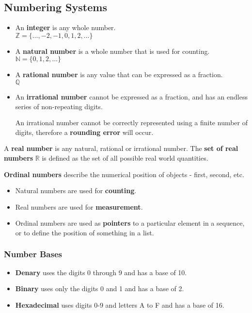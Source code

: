 \subsection{Numbering Systems}

\begin{itemize}
    \item An \textbf{integer} is any whole number.\\
        $\mathbb{Z}=\{\dots,-2,-1,0,1,2,\dots\}$
    \item A \textbf{natural number} is a whole number that is used for counting.\\
        $\mathbb{N}=\{0,1,2,\dots\}$
    \item A \textbf{rational number} is any value that can be expressed as a fraction.\\
        $\mathbb{Q}$
    \item An \textbf{irrational number} cannot be expressed as a fraction, and has an endless series of non-repeating digits.

        An irrational number cannot be correctly represented using a finite number of digits, therefore a \textbf{rounding error} will occur.
\end{itemize}

A \textbf{real number} is any natural, rational or irrational number. The \textbf{set of real numbers} $\mathbb{R}$ is defined as the set of all possible real world quantities.

\textbf{Ordinal numbers} describe the numerical position of objects - first, second, etc.
\begin{itemize}
    \item Natural numbers are used for \textbf{counting}.
    \item Real numbers are used for \textbf{measurement}.
    \item Ordinal numbers are used as \textbf{pointers} to a particular element in a sequence, or to define the position of something in a list.
\end{itemize}

\subsubsection*{Number Bases}
\begin{itemize}
    \item \textbf{Denary} uses the digits 0 through 9 and has a base of 10.
    \item \textbf{Binary} uses only the digits 0 and 1 and has a base of 2.
    \item \textbf{Hexadecimal} uses digits 0-9 and letters A to F and has a base of 16.
\end{itemize}

